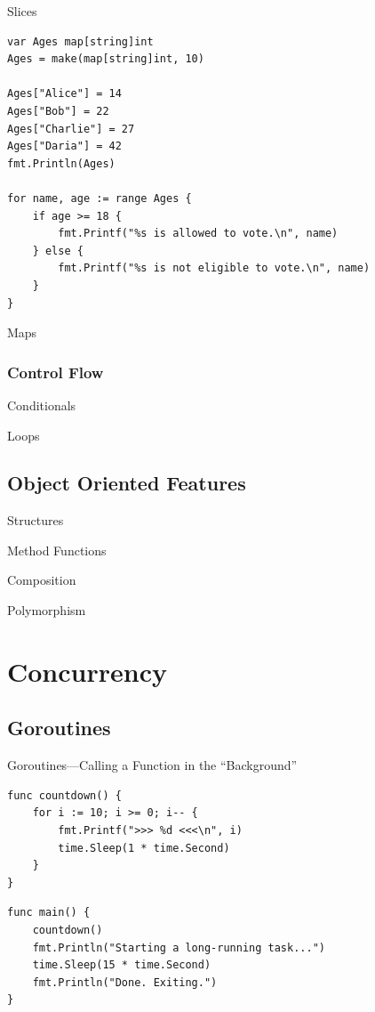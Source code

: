 \documentclass[pdf]{beamer}
\begin{document}
\begin{frame}[fragile]{Slices}
\begin{lstlisting}
var Ages map[string]int
Ages = make(map[string]int, 10)

Ages["Alice"] = 14
Ages["Bob"] = 22
Ages["Charlie"] = 27
Ages["Daria"] = 42
fmt.Println(Ages)

for name, age := range Ages {
    if age >= 18 {
        fmt.Printf("%s is allowed to vote.\n", name)
    } else {
        fmt.Printf("%s is not eligible to vote.\n", name)
    }
}
\end{lstlisting}
\end{frame}
\begin{frame}[fragile]{Maps}
\end{frame}
\subsubsection{Control Flow}
\begin{frame}[fragile]{Conditionals}
\end{frame}
\begin{frame}[fragile]{Loops}
\end{frame}

\subsection{Object Oriented Features}
\begin{frame}[fragile]{Structures}
\end{frame}

\begin{frame}[fragile]{Method Functions}
\end{frame}

\begin{frame}[fragile]{Composition}
\end{frame}

\begin{frame}[fragile]{Polymorphism}
\end{frame}

\section[Concurrency]{Concurrency}
\subsection{Goroutines}

\begin{frame}[fragile]{Goroutines---Calling a Function in the ``Background''}
\begin{lstlisting}
func countdown() {
    for i := 10; i >= 0; i-- {
        fmt.Printf(">>> %d <<<\n", i)
        time.Sleep(1 * time.Second)
    }
}
\end{lstlisting}
\pause
\begin{lstlisting}
func main() {
    countdown()
    fmt.Println("Starting a long-running task...")
    time.Sleep(15 * time.Second)
    fmt.Println("Done. Exiting.")
}
\end{lstlisting}
\end{frame}
\end{document}
